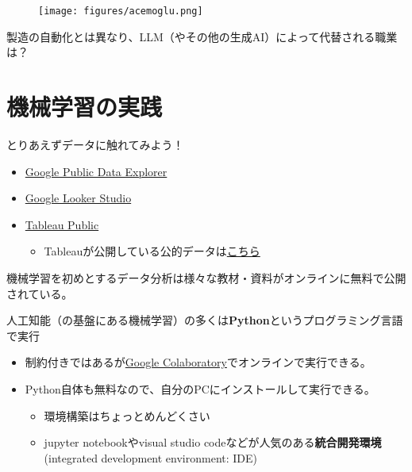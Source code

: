 \documentclass[
  xelatex,
  ja=standard]{bxjsarticle}
\providecommand{\tightlist}{%
  \setlength{\itemsep}{0pt}\setlength{\parskip}{0pt}}\usepackage{longtable,booktabs,array}
\begin{document}
\begin{figure}[htpb]

{\centering \texttt{[image: figures/acemoglu.png]}

}

\caption{\citet{acemoglu2020}}

\end{figure}

製造の自動化とは異なり、LLM（やその他の生成AI）によって代替される職業は？\citep{eloundou2023}

\hypertarget{ux6a5fux68b0ux5b66ux7fd2ux306eux5b9fux8df5}{%
\section{機械学習の実践}\label{ux6a5fux68b0ux5b66ux7fd2ux306eux5b9fux8df5}}

とりあえずデータに触れてみよう！

\begin{itemize}
\tightlist
\item
  \href{https://www.google.co.jp/publicdata/directory}{Google Public
  Data Explorer}
\item
  \href{https://www.tableau.com/learn/articles/free-public-data-sets}{Google
  Looker Studio}
\item
  \href{https://public.tableau.com/app/discover}{Tableau Public}

  \begin{itemize}
  \tightlist
  \item
    Tableauが公開している公的データは\href{https://www.tableau.com/learn/articles/free-public-data-sets}{こちら}
  \end{itemize}
\end{itemize}

機械学習を初めとするデータ分析は様々な教材・資料がオンラインに無料で公開されている。

人工知能（の基盤にある機械学習）の多くは\textbf{Python}というプログラミング言語で実行

\begin{itemize}
\tightlist
\item
  制約付きではあるが\href{https://colab.research.google.com/}{Google
  Colaboratory}でオンラインで実行できる。
\item
  Python自体も無料なので、自分のPCにインストールして実行できる。

  \begin{itemize}
  \tightlist
  \item
    環境構築はちょっとめんどくさい
  \item
    jupyter notebookやvisual studio
    codeなどが人気のある\textbf{統合開発環境} (integrated development
    environment: IDE)
  \end{itemize}
\end{itemize}
\end{document}
